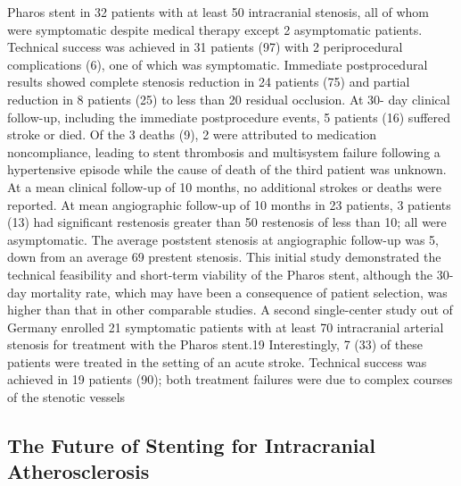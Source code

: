 \documentclass{article}
\begin{document}
Pharos stent in 32 patients with at least 50 intracranial 
stenosis, all of whom were symptomatic despite medical 
therapy except 2 asymptomatic patients. Technical success 
was achieved in 31 patients (97) with 2 periprocedural 
complications (6), one of which was symptomatic. Immediate postprocedural results showed complete stenosis 
reduction in 24 patients (75) and partial reduction in 8 
patients (25) to less than 20 residual occlusion. At 30-
day clinical follow-up, including the immediate postprocedure events, 5 patients (16) suffered stroke or died. Of the 
3 deaths (9), 2 were attributed to medication noncompliance, leading to stent thrombosis and multisystem failure 
following a hypertensive episode while the cause of death 
of the third patient was unknown. At a mean clinical follow-up of 10 months, no additional strokes or deaths were 
reported. At mean angiographic follow-up of 10 months 
in 23 patients, 3 patients (13) had significant restenosis 
greater than 50%
restenosis of less than 10; all were asymptomatic. The average poststent stenosis at angiographic follow-up was 5, 
down from an average 69 prestent stenosis. This initial 
study demonstrated the technical feasibility and short-term 
viability of the Pharos stent, although the 30-day mortality 
rate, which may have been a consequence of patient selection, was higher than that in other comparable studies.
A second single-center study out of Germany enrolled 21 symptomatic patients with at least 70 intracranial arterial stenosis for treatment with the Pharos stent.19
Interestingly, 7 (33) of these patients were treated in the 
setting of an acute stroke. Technical success was achieved 
in 19 patients (90); both treatment failures were due to 
complex courses of the stenotic vessels






\subsection{The Future of Stenting for Intracranial
Atherosclerosis}
\end{document}
